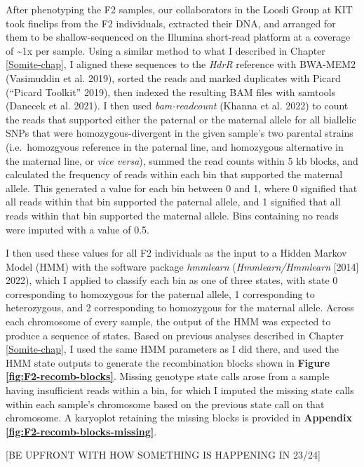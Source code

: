 \documentclass[
]{book}
\begin{document}
After phenotyping the F2 samples, our collaborators in the Loosli Group at KIT took finclips from the F2 individuals, extracted their DNA, and arranged for them to be shallow-sequenced on the Illumina short-read platform at a coverage of \textasciitilde1x per sample. Using a similar method to what I described in Chapter \ref{Somite-chap}, I aligned these sequences to the \emph{HdrR} reference with BWA-MEM2 (Vasimuddin et al. 2019), sorted the reads and marked duplicates with Picard ({``Picard Toolkit''} 2019), then indexed the resulting BAM files with samtools (Danecek et al. 2021). I then used \emph{bam-readcount} (Khanna et al. 2022) to count the reads that supported either the paternal or the maternal allele for all biallelic SNPs that were homozygous-divergent in the given sample's two parental strains (i.e.~homozgyous reference in the paternal line, and homozygous alternative in the maternal line, or \emph{vice versa}), summed the read counts within 5 kb blocks, and calculated the frequency of reads within each bin that supported the maternal allele. This generated a value for each bin between 0 and 1, where 0 signified that all reads within that bin supported the paternal allele, and 1 signified that all reads within that bin supported the maternal allele. Bins containing no reads were imputed with a value of 0.5.

I then used these values for all F2 individuals as the input to a Hidden Markov Model (HMM) with the software package \emph{hmmlearn} (\emph{Hmmlearn/Hmmlearn} {[}2014{]} 2022), which I applied to classify each bin as one of three states, with state 0 corresponding to homozygous for the paternal allele, 1 corresponding to heterozygous, and 2 corresponding to homozygous for the maternal allele. Across each chromosome of every sample, the output of the HMM was expected to produce a sequence of states. Based on previous analyses described in Chapter \ref{Somite-chap}, I used the same HMM parameters as I did there, and used the HMM state outputs to generate the recombination blocks shown in \textbf{Figure \ref{fig:F2-recomb-blocks}}. Missing genotype state calls arose from a sample having insufficient reads within a bin, for which I imputed the missing state calls within each sample's chromosome based on the previous state call on that chromosome. A karyoplot retaining the missing blocks is provided in \textbf{Appendix \ref{fig:F2-recomb-blocks-missing}}.

{[}BE UPFRONT WITH HOW SOMETHING IS HAPPENING IN 23/24{]}
\end{document}
